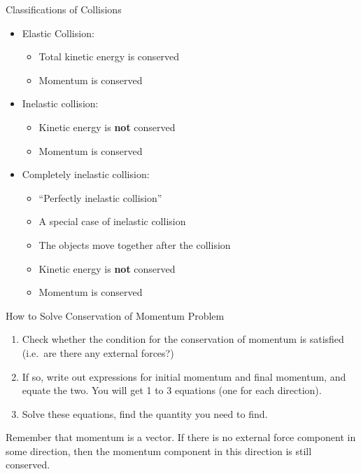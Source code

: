 \documentclass[12pt,compress,aspectratio=169]{beamer}
\begin{document}
\begin{frame}{Classifications of Collisions}
  \begin{itemize}
  \item Elastic Collision:
    \begin{itemize}
    \item Total kinetic energy is conserved
    \item<alert@2> Momentum is conserved
    \end{itemize}
  \item Inelastic collision:
    \begin{itemize}
    \item Kinetic energy is \textbf{not} conserved
    \item<alert@2> Momentum is conserved
    \end{itemize}
  \item Completely inelastic collision:
    \begin{itemize}
    \item ``Perfectly inelastic collision''
    \item A special case of inelastic collision
    \item The objects move together after the collision
    \item Kinetic energy is \textbf{not} conserved
    \item<alert@2> Momentum is conserved
    \end{itemize}
  \end{itemize}
\end{frame}



\begin{frame}{How to Solve Conservation of Momentum Problem}
  \begin{enumerate}
  \item Check whether the condition for the conservation of momentum is
    satisfied (i.e.\ are there any external forces?)
  \item If so, write out expressions for initial momentum and final momentum,
    and equate the two. You will get 1 to 3 equations (one for each direction).
  \item Solve these equations, find the quantity you need to find.
  \end{enumerate}
  Remember that momentum is a vector. If there is no external force component
  in some direction, then the momentum component in this direction is still
  conserved.
\end{frame}
\end{document}
